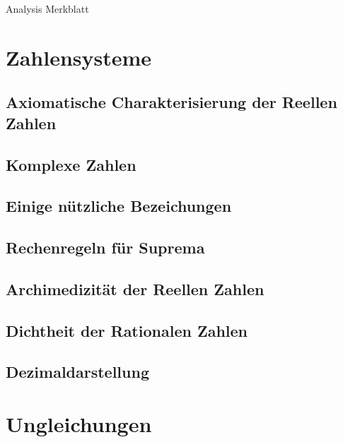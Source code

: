 \documentclass[10pt,a4paper^, twocolumn]{article}
\begin{document}

\begin{center}
  {\large Analysis Merkblatt}\\
  {}
\end{center}

\section{Zahlensysteme}
\subsection{Axiomatische Charakterisierung der Reellen Zahlen}
\subsection{Komplexe Zahlen}
\subsection{Einige nützliche Bezeichungen}
\subsection{Rechenregeln für Suprema}
\subsection{Archimedizität der Reellen Zahlen}
\subsection{Dichtheit der Rationalen Zahlen}
\subsection{Dezimaldarstellung}

\section{Ungleichungen}
\end{document}
